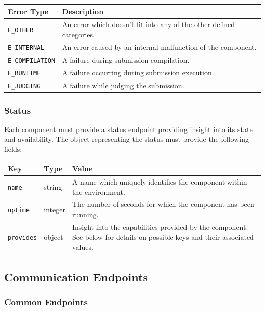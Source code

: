 \documentclass[11pt,letterpaper]{article}
\begin{document}
\begin{tabulary}{\textwidth}{ | l | L | }
    \hline
    \textbf{Error Type} & \textbf{Description} \\
    \hline
    \texttt{E\_OTHER} & An error which doesn't fit into any of the other
        defined categories. \\
    \hline
    \texttt{E\_INTERNAL} & An error caused by an internal malfunction of the
        component. \\
    \hline
    \texttt{E\_COMPILATION} & A failure during submission compilation. \\
    \hline
    \texttt{E\_RUNTIME} & A failure occurring during submission execution. \\
    \hline
    \texttt{E\_JUDGING} & A failure while judging the submission. \\
    \hline
\end{tabulary}

\subsubsection{Status}
\label{comm-formats-status}

Each component must provide a \hyperref[comm-endpoints-common]{status} endpoint
providing insight into its state and availability. The object representing the
status must provide the following fields:

\begin{tabulary}{\textwidth}{ | l | l | L | }
    \hline
    \textbf{Key} & \textbf{Type} & \textbf{Value} \\
    \hline
    \texttt{name} & string & A name which uniquely identifies the component
        within the environment. \\
    \hline
    \texttt{uptime} & integer & The number of seconds for which the component
        has been running. \\
    \hline
    \texttt{provides} & object & Insight into the capabilities provided by the
        component. See below for details on possible keys and their associated
        values. \\
    \hline
\end{tabulary}

\subsection{Communication Endpoints}
\label{comm-endpoints}

\subsubsection{Common Endpoints}
\label{comm-endpoints-common}
\end{document}
